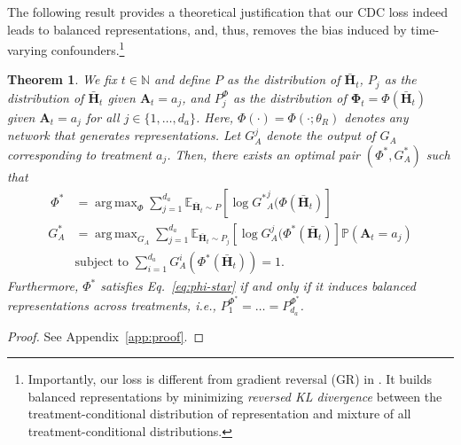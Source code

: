 \documentclass{article}
\theoremstyle{plain}
\newtheorem{theorem}{Theorem}[section]
\theoremstyle{definition}
\theoremstyle{remark}
\DeclareMathOperator*{\argmax}{arg\,max}
\begin{document}
The following result provides a theoretical justification that our CDC loss indeed leads to balanced representations, and, thus, removes the bias induced by time-varying confounders.\footnote{Importantly, our
loss is different from gradient reversal (GR) in \cite{ganin2015unsupervised, bica2020estimating}. It builds balanced representations by minimizing \emph{reversed KL divergence} between the treatment-conditional distribution of representation and mixture of all treatment-conditional distributions.}
\begin{theorem}\label{thrm:domain_conf_loss_short}
We fix $t \in \mathbb{N}$ and define $P$ as the distribution of $\bar{\mathbf{H}}_t$, $P_j$ as the distribution of $\bar{\mathbf{H}}_t$ given $\mathbf{A}_t = a_j$, and $P^\Phi_j$ as the distribution of $\mathbf{\Phi}_t = \Phi(\bar{\mathbf{H}}_t)$ given $\mathbf{A}_t = a_j$ for all $j \in \{1, \dots, d_a\}$. Here, $\Phi(\cdot) = \Phi(\cdot; \theta_R)$ denotes any network that generates representations. Let $G^j_A$ denote the output of $G_A$ corresponding to treatment $a_j$. Then, there exists an optimal pair $(\Phi^\ast, G^\ast_A)$ such that
\begin{align}\
 \Phi^\ast &= \argmax_{\Phi} \sum_{j=1}^{d_a} \mathbb{E}_{\bar{\mathbf{H}}_t \sim P}\left[ \log{G^\ast}^j_A(\Phi(\bar{\mathbf{H}}_t) \right] \label{eq:phi-star}\\
 G^\ast_A &= \argmax_{G_A} \sum_{j=1}^{d_a} \mathbb{E}_{\bar{\mathbf{H}}_t \sim P_j}\left[\log {G}^j_A(\Phi^\ast(\bar{\mathbf{H}}_t) \right] \mathbb{P}(\mathbf{A}_t = a_j) \label{eq:ga-star}\\
& \text{subject to }  \sum_{i=1}^{d_a} {G}^i_A(\Phi^\ast(\bar{\mathbf{H}}_t)) = 1.
\end{align}
Furthermore, $\Phi^\ast$ satisfies Eq.~\eqref{eq:phi-star} if and only if it induces balanced representations across treatments, i.e., $P^{\Phi^\ast}_1 = \ldots = P^{\Phi^\ast}_{d_a}$.
\end{theorem}
\begin{proof}
See Appendix~\ref{app:proof}.
\end{proof}
\end{document}
